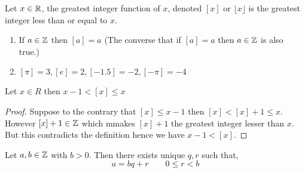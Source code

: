 \begin{definition}
    Let $x \in \mathbb{R}$, the greatest integer function of  $x$, denoted   $[x]$ or $\lfloor x \rfloor$ is the greatest integer  less than or equal to $x$. 
\end{definition}
\begin{eg}
    \begin{enumerate}
        \item If $a  \in \mathbb{Z}$ then $[a] = a$ (The converse that if $[a] = a$ then  $a \in \mathbb{Z}$ is also true.)
        \item $[\pi] = 3, [e] = 2, [-1.5] = -2, [-\pi] = -4$
    \end{enumerate}
\end{eg}

\begin{lemma} 
    Let $x \in R$ then  $ x - 1 <  [x] \le x$ 
\end{lemma}

\begin{proof}
    Suppose to the contrary that $[x] \le x - 1$ then $[x] < [x] + 1\le x$.  However $[x] + 1 \in \mathbb{Z}$ which mmakes  $[x] + 1$ the greatest integer lesser than $x$. But this contradicts the definition hence we have $x - 1 < [x]$. 
\end{proof}

\begin{theorem}
    Let $a, b \in \mathbb{Z}$ with  $b > 0$. Then there exists unique  $q, r$ such that,  
    $$ a = bq + r \qquad 0 \le r < b $$ 
\end{theorem}

